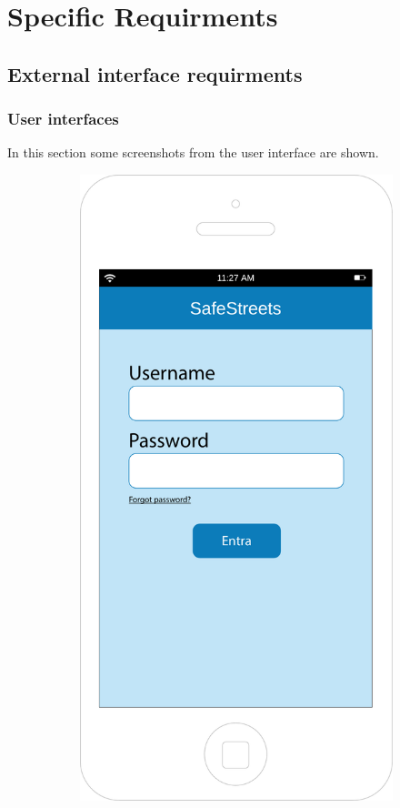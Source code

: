 \documentclass[12pt,a4paper]{report}
\begin{document}

\chapter{Specific Requirments}
	\section{External interface requirments}
		\subsection{User interfaces}
		In this section some screenshots from the user interface are shown. 
		\begin{figure}[h]
		\begin{subfigure}{0.5\textwidth}
			\includegraphics[scale=0.25, center]{Login}

\end{subfigure}
\end{figure}
\end{document}
